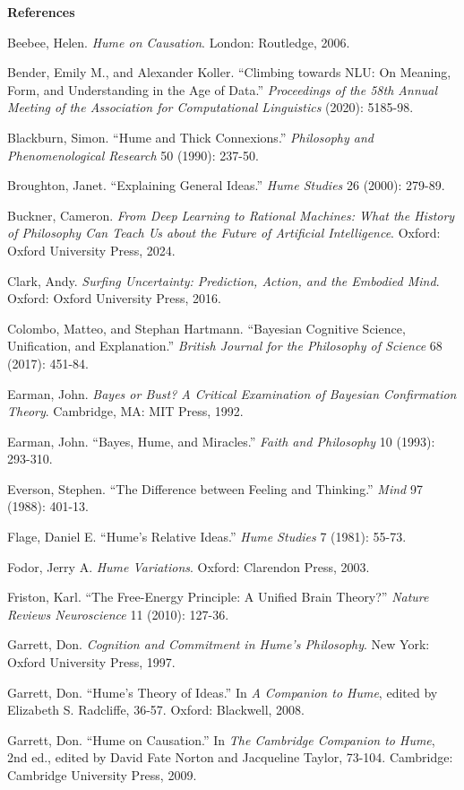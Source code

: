 \documentclass[11pt]{article}
\begin{document}
\bigskip

\newpage
\textbf{References}

Beebee, Helen. \emph{Hume on Causation}. London: Routledge, 2006.

Bender, Emily M., and Alexander Koller. ``Climbing towards NLU: On Meaning, Form, and Understanding in the Age of Data.'' \emph{Proceedings of the 58th Annual Meeting of the Association for Computational Linguistics} (2020): 5185-98.

Blackburn, Simon. ``Hume and Thick Connexions.'' \emph{Philosophy and Phenomenological Research} 50 (1990): 237-50.

Broughton, Janet. ``Explaining General Ideas.'' \emph{Hume Studies} 26 (2000): 279-89.

Buckner, Cameron. \emph{From Deep Learning to Rational Machines: What the History of Philosophy Can Teach Us about the Future of Artificial Intelligence}. Oxford: Oxford University Press, 2024.

Clark, Andy. \emph{Surfing Uncertainty: Prediction, Action, and the Embodied Mind}. Oxford: Oxford University Press, 2016.

Colombo, Matteo, and Stephan Hartmann. ``Bayesian Cognitive Science, Unification, and Explanation.'' \emph{British Journal for the Philosophy of Science} 68 (2017): 451-84.

Earman, John. \emph{Bayes or Bust? A Critical Examination of Bayesian Confirmation Theory}. Cambridge, MA: MIT Press, 1992.

Earman, John. ``Bayes, Hume, and Miracles.'' \emph{Faith and Philosophy} 10 (1993): 293-310.

Everson, Stephen. ``The Difference between Feeling and Thinking.'' \emph{Mind} 97 (1988): 401-13.

Flage, Daniel E. ``Hume's Relative Ideas.'' \emph{Hume Studies} 7 (1981): 55-73.

Fodor, Jerry A. \emph{Hume Variations}. Oxford: Clarendon Press, 2003.

Friston, Karl. ``The Free-Energy Principle: A Unified Brain Theory?'' \emph{Nature Reviews Neuroscience} 11 (2010): 127-36.

Garrett, Don. \emph{Cognition and Commitment in Hume's Philosophy}. New York: Oxford University Press, 1997.

Garrett, Don. ``Hume's Theory of Ideas.'' In \emph{A Companion to Hume}, edited by Elizabeth S. Radcliffe, 36-57. Oxford: Blackwell, 2008.

Garrett, Don. ``Hume on Causation.'' In \emph{The Cambridge Companion to Hume}, 2nd ed., edited by David Fate Norton and Jacqueline Taylor, 73-104. Cambridge: Cambridge University Press, 2009.
\end{document}
